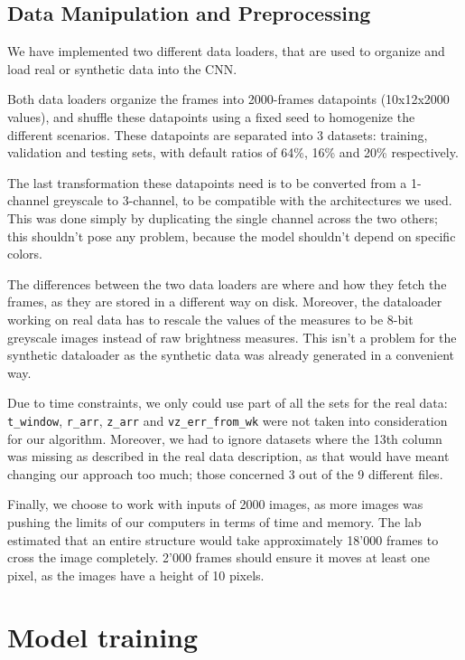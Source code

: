\documentclass[10pt,conference]{IEEEtran}
\begin{document}
\subsection{Data Manipulation and Preprocessing}
We have implemented two different data loaders, that are used to organize and load real or synthetic data into the CNN.\par
Both data loaders organize the frames into 2000-frames datapoints (10x12x2000 values), and shuffle these datapoints using a fixed seed to homogenize the different scenarios. These datapoints are separated into 3 datasets: training, validation and testing sets, with default ratios of 64\%, 16\% and 20\% respectively.\par
The last transformation these datapoints need is to be converted from a 1-channel greyscale to 3-channel, to be compatible with the architectures we used. This was done simply by duplicating the single channel across the two others; this shouldn't pose any problem, because the model shouldn't depend on specific colors.\par
The differences between the two data loaders are where and how they fetch the frames, as they are stored in a different way on disk. Moreover, the dataloader working on real data has to rescale the values of the measures to be 8-bit greyscale images instead of raw brightness measures. This isn't a problem for the synthetic dataloader as the synthetic data was already generated in a convenient way.

Due to time constraints, we only could use part of all the sets for the real data: \texttt{t\_window}, \texttt{r\_arr}, \texttt{z\_arr} and \texttt{vz\_err\_from\_wk} were not taken into consideration for our algorithm. Moreover, we had to ignore datasets where the 13th column was missing as described in the real data description, as that would have meant changing our approach too much; those concerned 3 out of the 9 different files.\par
Finally, we choose to work with inputs of 2000 images, as more images was pushing the limits of our computers in terms of time and memory. The lab estimated that an entire structure would take approximately 18'000 frames to cross the image completely. 2'000 frames should ensure it moves at least one pixel, as the images have a height of 10 pixels.\par


\section{Model training}
 
\end{document}
